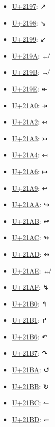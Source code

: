 \begin{itemize}
	\item \href{https://decodeunicode.org/en/u+2197}{U+2197}: ↗
	\item \href{https://decodeunicode.org/en/u+2198}{U+2198}: ↘
	\item \href{https://decodeunicode.org/en/u+2199}{U+2199}: ↙
	\item \href{https://decodeunicode.org/en/u+219A}{U+219A}: ↚
	\item \href{https://decodeunicode.org/en/u+219B}{U+219B}: ↛
	\item \href{https://decodeunicode.org/en/u+219E}{U+219E}: ↞
	\item \href{https://decodeunicode.org/en/u+21A0}{U+21A0}: ↠
	\item \href{https://decodeunicode.org/en/u+21A2}{U+21A2}: ↢
	\item \href{https://decodeunicode.org/en/u+21A3}{U+21A3}: ↣
	\item \href{https://decodeunicode.org/en/u+21A4}{U+21A4}: ↤
	\item \href{https://decodeunicode.org/en/u+21A6}{U+21A6}: ↦
	\item \href{https://decodeunicode.org/en/u+21A9}{U+21A9}: ↩
	\item \href{https://decodeunicode.org/en/u+21AA}{U+21AA}: ↪
	\item \href{https://decodeunicode.org/en/u+21AB}{U+21AB}: ↫
	\item \href{https://decodeunicode.org/en/u+21AC}{U+21AC}: ↬
	\item \href{https://decodeunicode.org/en/u+21AD}{U+21AD}: ↭
	\item \href{https://decodeunicode.org/en/u+21AE}{U+21AE}: ↮
	\item \href{https://decodeunicode.org/en/u+21AF}{U+21AF}: ↯
	\item \href{https://decodeunicode.org/en/u+21B0}{U+21B0}: ↰
	\item \href{https://decodeunicode.org/en/u+21B1}{U+21B1}: ↱
	\item \href{https://decodeunicode.org/en/u+21B6}{U+21B6}: ↶
	\item \href{https://decodeunicode.org/en/u+21B7}{U+21B7}: ↷
	\item \href{https://decodeunicode.org/en/u+21BA}{U+21BA}: ↺
	\item \href{https://decodeunicode.org/en/u+21BB}{U+21BB}: ↻
	\item \href{https://decodeunicode.org/en/u+21BC}{U+21BC}: ↼
	\item \href{https://decodeunicode.org/en/u+21BD}{U+21BD}: ↽

\end{itemize}

